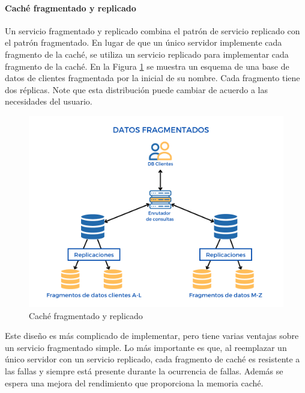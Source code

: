    \paragraph{Caché fragmentado y replicado}
    Un servicio fragmentado y replicado combina el patrón de servicio replicado  con el patrón fragmentado. En  lugar de que un único servidor implemente cada fragmento de la caché, se utiliza un servicio replicado para implementar cada fragmento de la caché. En la Figura \ref{fig:cache-frag-rep} se muestra un esquema de una base de datos de clientes fragmentada  por la inicial de su nombre. Cada fragmento tiene dos r\'eplicas. Note que esta distribuci\'on puede cambiar  de  acuerdo a las necesidades del usuario.
    
     
    \begin{figure}    
    	\begin{center}%
     	\includegraphics[width=0.8\linewidth] {9/8.png} 
    	\caption{Caché fragmentado y replicado }
    	\label{fig:cache-frag-rep}
    \end{center} 
 \end{figure}
   
   Este diseño es más complicado de implementar, pero tiene varias ventajas sobre un servicio fragmentado simple. Lo más importante es que, al reemplazar un único servidor con un servicio replicado, cada fragmento de caché es resistente a las fallas y siempre está presente durante la ocurrencia de  fallas. Adem\'as se espera una mejora del rendimiento que proporciona la memoria caché. 
   
  
  
  

 